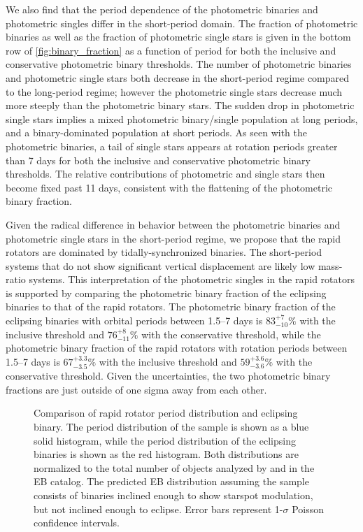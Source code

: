 \documentclass[manuscript]{aastex6}
\begin{document}
We also find that the period dependence of the photometric binaries and
photometric singles differ in the short-period domain. The fraction of
photometric binaries as well as the fraction of
photometric single stars is given in the bottom row of
\cref{fig:binary_fraction} as a function of period for both the inclusive and 
conservative photometric binary thresholds. The number of photometric binaries 
and photometric single stars both decrease in the short-period regime compared to the 
long-period regime; however the photometric single stars decrease much more 
steeply than the photometric binary stars. The sudden drop in photometric 
single stars implies a mixed photometric binary/single population at long 
periods, and a binary-dominated population at short periods. As seen with the
photometric binaries, a tail of single stars appears at rotation periods 
greater than 7 days for both the inclusive and conservative photometric binary 
thresholds. The relative contributions of photometric and single stars then 
become fixed past 11 days, consistent with the flattening of the photometric 
binary fraction. 

Given the radical difference in behavior between the photometric binaries and
photometric single stars in the short-period regime, we propose that the 
rapid rotators are dominated by tidally-synchronized binaries. The 
short-period systems that do not show significant vertical displacement are 
likely low mass-ratio systems. This interpretation of the photometric singles 
in the rapid rotators is supported by comparing the photometric binary 
fraction of the eclipsing binaries to that of the rapid rotators. The 
photometric binary fraction of the eclipsing binaries with orbital periods 
between 1.5--7 days is \(83^{+7}_{-10}\%\) with the inclusive threshold and 
\(76^{+8}_{-11}\%\) with the conservative threshold, while the photometric 
binary fraction of the rapid rotators with rotation periods between 1.5--7
days is \(67^{+3.3}_{-3.5}\%\) with the inclusive threshold and
\(59^{+3.6}_{-3.6}\%\) with the conservative threshold.  Given the
uncertainties, the two photometric binary fractions are just outside of one 
sigma away from each other.

\begin{figure}[htb]
    \centering
    \caption{Comparison of rapid rotator period distribution and eclipsing
    binary. The period distribution of the \citet{McQuillan14} sample is shown
as a blue solid histogram, while the period distribution of the eclipsing binaries
is shown as the red histogram. Both distributions are normalized to the total
number of objects analyzed by \citet{McQuillan14} and in the EB catalog. The predicted EB 
distribution assuming the \citet{McQuillan14} sample consists of binaries 
inclined enough to show starspot modulation, but not inclined enough to eclipse. 
Error bars represent 1-\(\sigma\) Poisson confidence 
intervals.}\label{fig:eclipseprob}
\end{figure}
\end{document}
